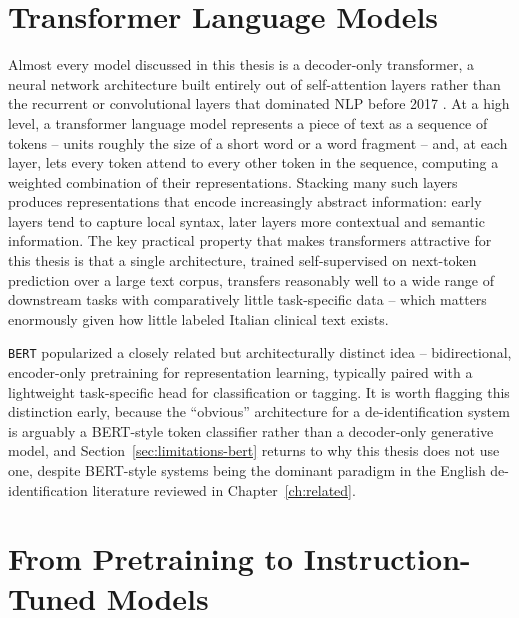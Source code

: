 \documentclass[12pt,a4paper]{report}
\begin{document}
\section{Transformer Language Models}

Almost every model discussed in this thesis is a decoder-only transformer, a neural network architecture built entirely out of self-attention layers rather than the recurrent or convolutional layers that dominated NLP before 2017 \citep{vaswani2017attention}. At a high level, a transformer language model represents a piece of text as a sequence of tokens -- units roughly the size of a short word or a word fragment -- and, at each layer, lets every token attend to every other token in the sequence, computing a weighted combination of their representations. Stacking many such layers produces representations that encode increasingly abstract information: early layers tend to capture local syntax, later layers more contextual and semantic information. The key practical property that makes transformers attractive for this thesis is that a single architecture, trained self-supervised on next-token prediction over a large text corpus, transfers reasonably well to a wide range of downstream tasks with comparatively little task-specific data -- which matters enormously given how little labeled Italian clinical text exists.

\texttt{BERT} \citep{devlin2019bert} popularized a closely related but architecturally distinct idea -- bidirectional, encoder-only pretraining for representation learning, typically paired with a lightweight task-specific head for classification or tagging. It is worth flagging this distinction early, because the ``obvious'' architecture for a de-identification system is arguably a BERT-style token classifier rather than a decoder-only generative model, and Section~\ref{sec:limitations-bert} returns to why this thesis does not use one, despite BERT-style systems being the dominant paradigm in the English de-identification literature reviewed in Chapter~\ref{ch:related}.

\section{From Pretraining to Instruction-Tuned Models}
\end{document}
